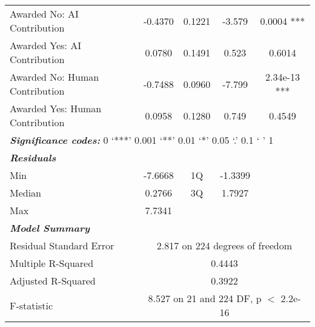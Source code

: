 \begin{table}[ht]
\begin{tabular}{lcccc}
        Awarded No: AI Contribution & -0.4370  & 0.1221  & -3.579  & 0.0004 ***  \\
        Awarded Yes: AI Contribution & 0.0780  & 0.1491  & 0.523  & 0.6014  \\
        Awarded No: Human Contribution & -0.7488  & 0.0960  & -7.799  & 2.34e-13 ***  \\
        Awarded Yes: Human Contribution & 0.0958  & 0.1280  & 0.749  & 0.4549  \\
        \midrule
        \multicolumn{5}{l}{\textbf{\textit{Significance codes:}} 0 ‘***’ 0.001 ‘**’ 0.01 ‘*’ 0.05 ‘.’ 0.1 ‘ ’ 1} \\
        \midrule
        \textbf{\textit{Residuals}} & \multicolumn{4}{c}{} \\
        Min & -7.6668 & 1Q & -1.3399 &  \\
        Median & 0.2766 & 3Q & 1.7927 &  \\
        Max & 7.7341 &  &  &  \\
        \midrule
        \textbf{\textit{Model Summary}}\\
        Residual Standard Error & \multicolumn{4}{c}{2.817 on 224 degrees of freedom} \\
        Multiple R-Squared & \multicolumn{4}{c}{0.4443} \\
        Adjusted R-Squared & \multicolumn{4}{c}{0.3922} \\
        F-statistic & \multicolumn{4}{c}{8.527 on 21 and 224 DF, p $<$ 2.2e-16} \\
        \bottomrule
    \end{tabular}
    \label{tab:regression_fairness_female}
\end{table}


